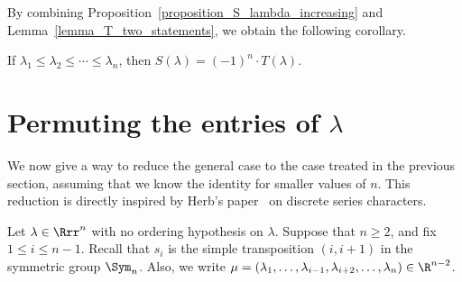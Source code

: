By combining
Proposition~\ref{proposition_S_lambda_increasing}
and
Lemma~\ref{lemma_T_two_statements},
we obtain the following corollary.
\begin{coro} 
If $\lambda_{1} \leq \lambda_{2} \leq \cdots \leq \lambda_{n}$, then
$S(\lambda)=(-1)^{n} \cdot  T(\lambda)$.
\label{corollary_base_case}
\end{coro}







\section{Permuting the entries of \texorpdfstring{$\lambda$}{lambda}}
\label{section_permute}

We now give a way to reduce the general case to the case treated
in the previous section,
assuming that we know the identity for smaller values of $n$.
This reduction is
directly inspired by Herb's paper~\cite{Herb} 
on discrete series characters. 

Let $\lambda \in \Rrr^{n}$
with no ordering hypothesis on $\lambda$.
Suppose that $n \geq 2$, and fix $1 \leq i \leq n-1$.
Recall that $s_{i}$ is the simple transposition $(i,i+1)$
in the symmetric group $\Sym_{n}$.
Also, we write
$\mu=(\lambda_{1},\ldots,\lambda_{i-1},\lambda_{i+2},\ldots,\lambda_{n})\in\R^{n-2}$.

